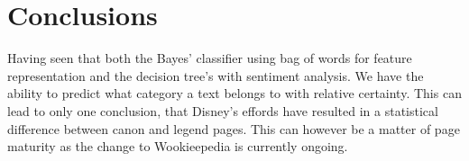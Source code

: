 \section{Conclusions}
Having seen that both the Bayes’ classifier using bag of words for feature representation and the decision tree’s with sentiment analysis. We have the ability to predict what category a text belongs to with relative certainty. This can lead to only one conclusion, that Disney's effords have resulted in a statistical difference between canon and legend pages. This can however be a matter of page maturity as the change to Wookieepedia is currently ongoing.

